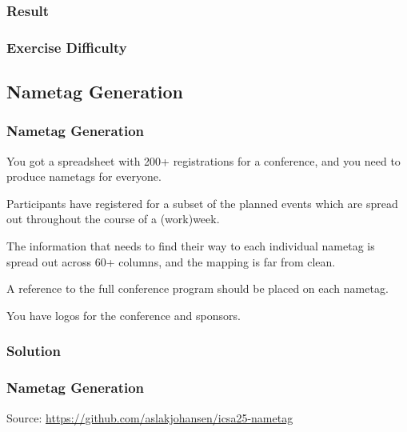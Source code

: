 {\subsubsection{Result}
\begin{frame}[fragile]
  \frametitle{Exercise Difficulty }
\end{frame}

\subsection{Nametag Generation}
\begin{frame}[fragile]
  \frametitle{Nametag Generation}
  \vspace{3mm}
  You got a spreadsheet with 200+ registrations for a conference, and you need to produce nametags for everyone.
  
  \vspace{5mm}
  Participants have registered for a subset of the planned events which are spread out throughout the course of a (work)week.
  
  \vspace{5mm}
  The information that needs to find their way to each individual nametag is spread out across 60+ columns, and the mapping is far from clean.
  
  \vspace{5mm}
  A reference to the full conference program should be placed on each nametag.
  
  \vspace{5mm}
  You have logos for the conference and sponsors.
\end{frame}

\subsubsection{Solution}
\begin{frame}[fragile]
  \frametitle{Nametag Generation }
  \vspace{3mm}
  
  \vspace{5mm}
  Source: \url{https://github.com/aslakjohansen/icsa25-nametag}
\end{frame}

}
